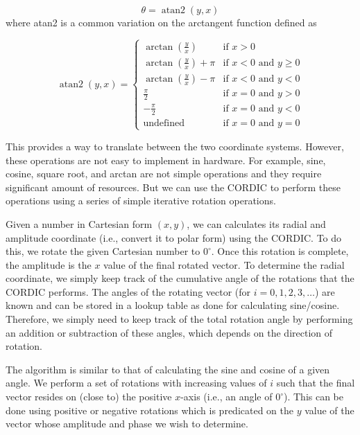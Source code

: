 \begin{equation}
\theta = \operatorname{atan2}(y, x)
\end{equation}
where atan2 is a common variation on the arctangent function defined as
\begin{footnotesize}
\begin{equation}
\operatorname{atan2}(y, x) =
\begin{cases}
\arctan(\frac{y}{x}) & \mbox{if } x > 0\\
\arctan(\frac{y}{x}) + \pi & \mbox{if } x < 0 \mbox{ and } y \ge 0\\
\arctan(\frac{y}{x}) - \pi & \mbox{if } x < 0 \mbox{ and } y < 0\\
\frac{\pi}{2} & \mbox{if } x = 0 \mbox{ and } y > 0\\
-\frac{\pi}{2} & \mbox{if } x = 0 \mbox{ and } y < 0\\
\text{undefined} & \mbox{if } x = 0 \mbox{ and } y = 0
\end{cases}
\end{equation}
\end{footnotesize}

This provides a way to translate between the two coordinate systems. However, these operations are not easy to implement in hardware. For example, sine, cosine, square root, and arctan are not simple operations and they require significant amount of resources. But we can use the CORDIC to perform these operations using a series of simple iterative rotation operations. 

Given a number in Cartesian form $(x,y)$, we can calculates its radial and amplitude coordinate (i.e., convert it to polar form) using the CORDIC. To do this, we rotate the given Cartesian number to $0^{\circ}$. Once this rotation is complete, the amplitude is the $x$ value of the final rotated vector. To determine the radial coordinate, we simply keep track of the cumulative angle of the rotations that the CORDIC performs. The angles of the rotating vector (for $i = 0,1,2,3, \dots$) are known and can be stored in a lookup table as done for calculating sine/cosine. Therefore, we simply need to keep track of the total rotation angle by performing an addition or subtraction of these angles, which depends on the direction of rotation.

The algorithm is similar to that of calculating the sine and cosine of a given angle. We perform a set of rotations with increasing values of $i$ such that the final vector resides on (close to) the positive $x$-axis (i.e., an angle of $0^{\circ}$). This can be done using positive or negative rotations  which is predicated on the $y$ value of the vector whose amplitude and phase we wish to determine. 

